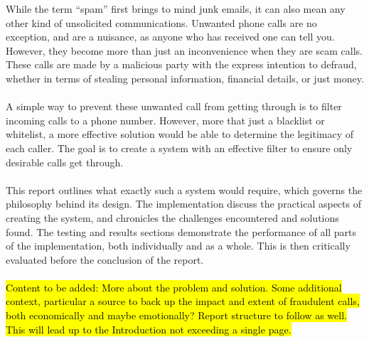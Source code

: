 \documentclass[main.tex]{subfiles}
\begin{document}
\setcounter{page}{1}

While the term ``spam'' first brings to mind junk emails, it can also mean any other kind of unsolicited communications. Unwanted phone calls are no exception, and are a nuisance, as anyone who has received one can tell you. However, they become more than just an inconvenience when they are scam calls. These calls are made by a malicious party with the express intention to defraud, whether in terms of stealing personal information, financial details, or just money.
\\\\
A simple way to prevent these unwanted call from getting through is to filter incoming calls to a phone number. However, more that just a blacklist or whitelist, a more effective solution would be able to determine the legitimacy of each caller. The goal is to create a system with an effective filter to ensure only desirable calls get through.
\\\\
This report outlines what exactly such a system would require, which governs the philosophy behind its design. The implementation discuss the practical aspects of creating the system, and chronicles the challenges encountered and solutions found. The testing and results sections demonstrate the performance of all parts of the implementation, both individually and as a whole. This is then critically evaluated before the conclusion of the report.  
\\\\
\hl{Content to be added: More about the problem and solution. Some additional context, particular a source to back up the impact and extent of fraudulent calls, both economically and maybe emotionally? Report structure to follow as well. This will lead up to the Introduction not exceeding a single page.}
\end{document}
